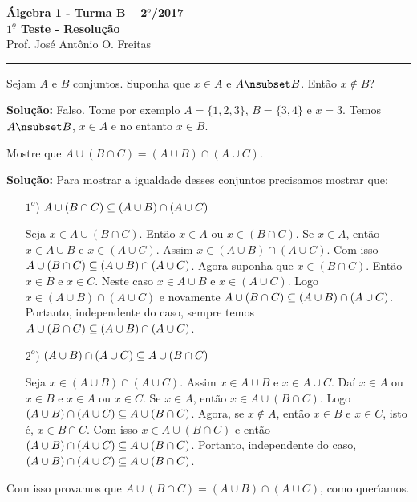 \documentclass[12pt]{article}
\begin{document}


\begin{center}
{\Large\bf {\'A}lgebra 1 - Turma B -- 2$^{o}$/2017} \\ \vspace{9pt} {\large\bf
  $1^{\underline{o}}$ Teste - Resolu\c{c}\~ao}\\
\vspace{9pt} Prof. Jos{\'e} Ant{\^o}nio O. Freitas
\end{center}
\hrule

\vspace{.6cm}


\vspace{.6cm}

\questao Sejam $A$ e $B$ conjuntos. Suponha que $x \in A$ e $A \nsub B$. Então $x \notin B$?

\noindent\textbf{Solu\c{c}\~ao:} Falso. Tome por exemplo $A = \{1,2,3\}$, $B = \{3,4\}$ e $x = 3$. Temos $A \nsub B$, $x \in A$ e no entanto $x \in B$.

\vspace{.5cm}

\questao Mostre que $A \cup ( B \cap C) = (A \cup B) \cap (A \cup C)$.

\noindent\textbf{Solu\c{c}\~ao:} Para mostrar a igualdade desses conjuntos precisamos mostrar que:
\begin{enumerate}
	\item [$1^o$)] $A \cup ( B \cap C) \subseteq (A \cup B) \cap (A \cup C)$

	Seja $x \in A \cup ( B \cap C)$. Ent\~ao $x \in A$ ou $x \in (B \cap C)$. Se $x \in A$, ent\~ao $x \in A \cup B$ e $x \in (A \cup C)$. Assim $x \in (A \cup B) \cap (A \cup C)$. Com isso $A \cup ( B \cap C) \subseteq (A \cup B) \cap (A \cup C)$. Agora suponha que $x \in (B \cap C)$. Ent\~ao $x \in B$ e $x \in C$. Neste caso $x \in A \cup B$ e $x \in (A \cup C)$. Logo $x \in (A \cup B) \cap (A \cup C)$ e novamente $A \cup ( B \cap C) \subseteq (A \cup B) \cap (A \cup C)$. Portanto, independente do caso, sempre temos $A \cup ( B \cap C) \subseteq (A \cup B) \cap (A \cup C)$.

	\item [$2^o$)] $(A \cup B) \cap (A \cup C) \subseteq A \cup ( B \cap C)$

	Seja $x \in (A \cup B) \cap (A \cup C)$. Assim $x \in A \cup B$ e $x \in A \cup C$. Daí $x \in A$ ou $x \in B$ e $x \in A$ ou $x \in C$. Se $x \in A$, então $x \in A \cup (B \cap C)$. Logo $(A \cup B) \cap (A \cup C) \subseteq A \cup ( B \cap C)$. Agora, se $x \notin A$, então $x \in B$ e $x \in C$, isto é, $x \in B \cap C$. Com isso $x \in A \cup (B \cap C)$ e então $(A \cup B) \cap (A \cup C) \subseteq A \cup ( B \cap C)$. Portanto, independente do caso, $(A \cup B) \cap (A \cup C) \subseteq A \cup ( B \cap C)$.
\end{enumerate}
Com isso provamos que $A \cup ( B \cap C) = (A \cup B) \cap (A \cup C)$, como quer{\'\i}amos.
\end{document}

